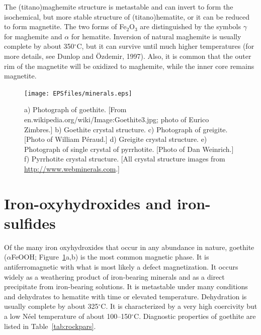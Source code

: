  


 The (titano)maghemite  structure is metastable and can invert to form the isochemical, but more stable structure of (titano)hematite, or it can be reduced to form magnetite.    The two forms of Fe$_2$O$_3$ are distinguished by the symbols $\gamma$ for maghemite and $\alpha$ for hematite.    Inversion of natural maghemite is usually complete by about 350$^{\circ}$C,
but it can survive until much higher temperatures (for more details, see
\nocite{dunlop97}
 Dunlop and \"Ozdemir, 1997).     Also, it is common that the outer rim of the magnetite will be oxidized to maghemite, while the inner core remains magnetite.    


 
\begin{figure}[htb]
\centering  \texttt{[image: EPSfiles/minerals.eps]}
\caption{  a) Photograph of goethite. [From  en.wikipedia.org/wiki/Image:Goethite3.jpg; photo of  Eurico Zimbres.]   b) Goethite crystal structure. 
c) Photograph of greigite.  [Photo of William P\'eraud.]   d) Greigite crystal structure. 
e) Photograph of single crystal of pyrrhotite. [Photo of Dan Weinrich.]  f) Pyrrhotite crystal structure.  [All crystal structure images from \href{http://www.webminerals.com}{http://www.webminerals.com}.]}
\label{fig:minerals}
\end{figure}


\section {Iron-oxyhydroxides and iron-sulfides}
\label{sect:pyrrho}

%
Of the many  iron oxyhydroxides that occur in any abundance
in nature, 
%
goethite ($\alpha$FeOOH; Figure~\ref{fig:minerals}a,b) is the most common magnetic phase. It is
%
%
antiferromagnetic with what is 
most likely a defect magnetization.  It occurs
widely as a weathering product of iron-bearing minerals and as a direct
precipitate from iron-bearing solutions.  It is metastable  under
many conditions and dehydrates to
hematite with time or elevated temperature.  Dehydration is usually complete by
about 325$^{\circ}$C.  It is characterized by a very high coercivity but a low 
N\'eel
temperature of about 100--150$^{\circ}$C.
 Diagnostic properties of goethite are listed in Table~\ref{tab:rockpars}.
 


